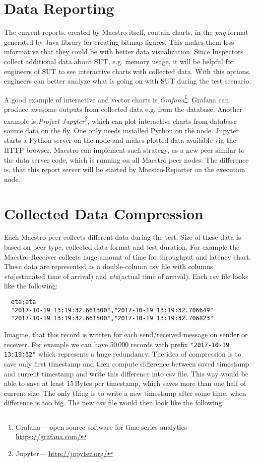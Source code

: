 \section{Data Reporting}
The current reports, created by Maestro itself, contain charts, in the \emph{png} format generated by Java library for creating bitmap figures. This makes them less informative that they could be with better data visualization. Since Inspectors collect additional data about SUT, e.g. memory usage, it will be helpful for engineers of SUT to see interactive charts with collected data. With this options, engineers can better analyze what is going on with SUT during the test scenario.

A good example of interactive and vector charts is \emph{Grafana}\footnote{Grafana\,---\,open source software for time series analytics \url{https://grafana.com/}}. Grafana can produce awesome outputs from collected data e.g. from the database. Another example is \emph{Project Jupyter}\footnote{Jupyter\,---\,\url{http://jupyter.org/}}, which can plot interactive charts from database source data on the fly. One only needs installed Python on the node. Jupyter starts a Python server on the node and makes plotted data available via the HTTP browser. Maestro can implement such strategy, as a new peer similar to the data server code, which is running on all Maestro peer nodes. The difference is, that this report server will be started by Maestro-Reporter on the execution node.

\section{Collected Data Compression}
Each Maestro peer collects different data during the test. Size of these data is based on peer type, collected data format and test duration. For example the Maestro-Receiver collects huge amount of time for throughput and latency chart. These data are represented as a double-column csv file with columns \emph{eta}(estimated time of arrival) and \emph{ata}(actual time of arrival). Each csv file looks like the following:

\begin{verbatim}
  eta;ata
  "2017-10-19 13:19:32.661300","2017-10-19 13:19:32.706649"
  "2017-10-19 13:19:32.661500","2017-10-19 13:19:32.706823"
\end{verbatim}

Imagine, that this record is written for each send/received message on sender or receiver. For example we can have 50\,000 records with prefix \texttt{"2017-10-19 13:19:32"} which represents a huge redundancy. The idea of compression is to save only first timestamp and then compute difference between saved timestamp and current timestamp and write this difference into csv file. This way would be able to save at least 15\,Bytes per timestamp, which saves more than one half of current size. The only thing is to write a new timestamp after some time, when difference is too big. The new csv file would then look like the following:

